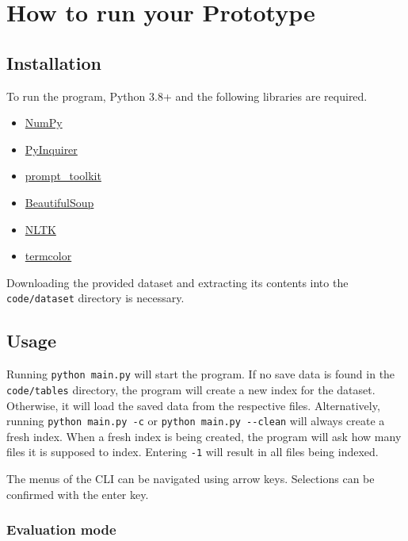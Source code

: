 \section{How to run your Prototype}
\label{sec:guide}

\subsection{Installation}

To run the program, Python 3.8+ and the following libraries are required.

\begin{itemize}
  \item \href{https://numpy.org}{NumPy}
  \item \href{https://github.com/CITGuru/PyInquirer}{PyInquirer}
  \item \href{https://github.com/prompt-toolkit/python-prompt-toolkit}{prompt\_toolkit}
  \item \href{https://www.crummy.com/software/BeautifulSoup/bs4/doc/}{BeautifulSoup}
  \item \href{https://www.nltk.org}{NLTK}
  \item \href{https://pypi.org/project/termcolor/}{termcolor}
\end{itemize}

Downloading the provided dataset and extracting its contents into the \verb|code/dataset| directory is necessary.

\subsection{Usage}

Running \verb|python main.py| will start the program.
If no save data is found in the \verb|code/tables| directory, the program will create a new index for the dataset.
Otherwise, it will load the saved data from the respective files.
Alternatively, running \verb|python main.py -c| or \verb|python main.py --clean| will always create a fresh index.
When a fresh index is being created, the program will ask how many files it is supposed to index.
Entering \verb|-1| will result in all files being indexed.

The menus of the CLI can be navigated using arrow keys.
Selections can be confirmed with the enter key.

\subsubsection{Evaluation mode}

